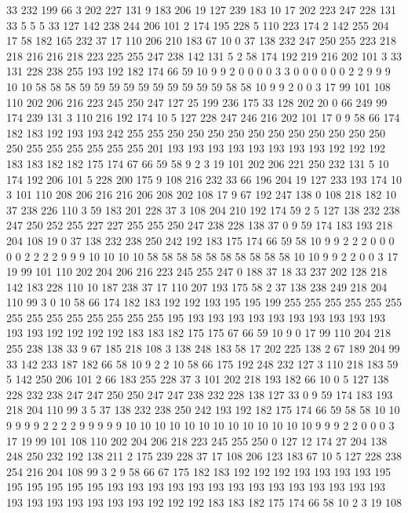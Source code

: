 33 232 199 66 3 202 227 131 9 183 206 19 127 239 183 10 17 202 223 247
228 131 33 5 5 5 33 127 142 238 244 206 101 2 174 195 228 5 110 223
174 2 142 255 204 17 58 182 165 232 37 17 110 206 210 183 67 10 0 37
138 232 247 250 255 223 218 218 216 216 218 223 225 255 247 238 142 131 5 2
58 174 192 219 216 202 101 3 33 131 228 238 255 193 192 182 174 66 59 10
9 9 2 0 0 0 0 3 3 0 0 0 0 0 0 2 2 9 9 9
10 10 58 58 58 59 59 59 59 59 59 59 59 59 59 58 58 10 9 9
2 0 0 3 17 99 101 108 110 202 206 216 223 245 250 247 127 25 199 236
175 33 128 202 20 0 66 249 99 174 239 131 3 110 216 192 174 10 5 127
228 247 246 216 202 101 17 0 9 58 66 174 182 183 192 193 193 242 255 255
250 250 250 250 250 250 250 250 250 250 250 250 255 255 255 255 255 255 201 193
193 193 193 193 193 193 193 192 192 192 183 183 182 182 175 174 67 66 59 58
9 2 3 19 101 202 206 221 250 232 131 5 10 174 192 206 101 5 228 200
175 9 108 216 232 33 66 196 204 19 127 233 193 174 10 3 101 110 208 206
216 216 206 208 202 108 17 9 67 192 247 138 0 108 218 182 10 37 238 226
110 3 59 183 201 228 37 3 108 204 210 192 174 59 2 5 127 138 232 238
247 250 252 255 227 227 255 255 250 247 238 228 138 37 0 9 59 174 183 193
218 204 108 19 0 37 138 232 238 250 242 192 183 175 174 66 59 58 10 9
9 2 2 2 0 0 0 0 0 2 2 2 2 9 9 9 10 10 10 10
58 58 58 58 58 58 58 58 58 58 10 10 9 9 2 2 0 0 3 17
19 99 101 110 202 204 206 216 223 245 255 247 0 188 37 18 33 237 202 128
218 142 183 228 110 10 187 238 37 17 110 207 193 175 58 2 37 138 238 249
218 204 110 99 3 0 10 58 66 174 182 183 192 192 193 195 195 199 255 255
255 255 255 255 255 255 255 255 255 255 255 255 195 193 193 193 193 193 193 193
193 193 193 193 193 192 192 192 192 183 183 182 175 175 67 66 59 10 9 0
17 99 110 204 218 255 238 138 33 9 67 185 218 108 3 138 248 183 58 17
202 225 138 2 67 189 204 99 33 142 233 187 182 66 58 10 9 2 2 10
58 66 175 192 248 232 127 3 110 218 183 59 5 142 250 206 101 2 66 183
255 228 37 3 101 202 218 193 182 66 10 0 5 127 138 228 232 238 247 247
250 250 247 247 238 232 228 138 127 33 0 9 59 174 183 193 218 204 110 99
3 5 37 138 232 238 250 242 193 192 182 175 174 66 59 58 58 10 10 9
9 9 9 2 2 2 2 9 9 9 9 9 10 10 10 10 10 10 10 10
10 10 10 10 10 9 9 9 2 2 0 0 0 3 17 19 99 101 108 110
202 204 206 218 223 245 255 250 0 127 12 174 27 204 138 248 250 232 192 138
211 2 175 239 228 37 17 108 206 123 183 67 10 5 127 228 238 254 216 204
108 99 3 2 9 58 66 67 175 182 183 192 192 192 193 193 193 193 195 195
195 195 195 195 193 193 193 193 193 193 193 193 193 193 193 193 193 193 193 193
193 193 193 193 193 192 192 192 183 183 182 175 174 66 58 10 2 3 19 108
